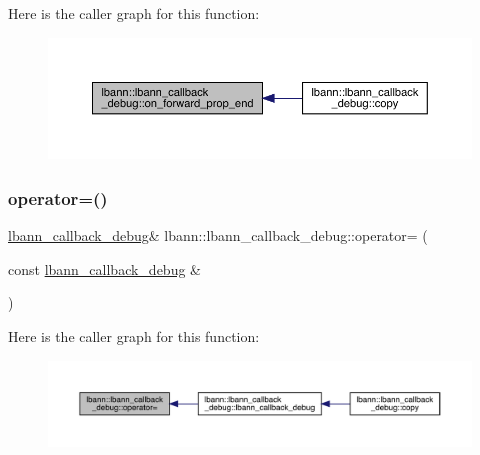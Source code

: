 Here is the caller graph for this function\+:\nopagebreak
\begin{figure}[H]
\begin{center}
\leavevmode
\includegraphics[width=350pt]{classlbann_1_1lbann__callback__debug_acb3d05be6c600f4d61957ccf10606ddc_icgraph}
\end{center}
\end{figure}
\mbox{\label{classlbann_1_1lbann__callback__debug_ad30a57ba6ec0b7e479345647651a8e83}} 
\subsubsection{\texorpdfstring{operator=()}{operator=()}}
{\footnotesize\ttfamily \hyperlink{classlbann_1_1lbann__callback__debug}{lbann\+\_\+callback\+\_\+debug}\& lbann\+::lbann\+\_\+callback\+\_\+debug\+::operator= (\begin{DoxyParamCaption}\item[{const \hyperlink{classlbann_1_1lbann__callback__debug}{lbann\+\_\+callback\+\_\+debug} \&}]{ }\end{DoxyParamCaption})\hspace{0.3cm}{\ttfamily [default]}}

Here is the caller graph for this function\+:\nopagebreak
\begin{figure}[H]
\begin{center}
\leavevmode
\includegraphics[width=350pt]{classlbann_1_1lbann__callback__debug_ad30a57ba6ec0b7e479345647651a8e83_icgraph}
\end{center}
\end{figure}


